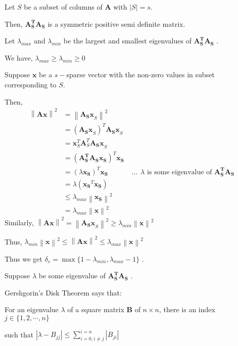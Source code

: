 \documentclass[fleqn, 11pt]{article}
\newcommand{\bs}[1]{\boldsymbol{#1}}
\newcommand\norm[1]{\left\lVert#1\right\rVert}
\begin{document}
Let $S$ be a subset of columns of $\bs{A}$ with $|S|=s$. 

\medskip 

Then, $\bs{A_S^TA_S}$ is a symmetric positive semi definite matrix. 

\medskip 

Let $\lambda_{max}$ and $\lambda_{min}$ be the largest and smallest eigenvalues of $\bs{A_S^TA_S}$ . 

We have, $\lambda_{max} \geq   \lambda_{min} \geq 0$


Suppose $\bs{x}$ be a $s-$sparse vector with the non-zero values in subset corresponding to $S$. 

Then,
\begin{align*}
    \norm{\bs{Ax}}^2 &= \norm{\bs{A_Sx}_S}^2  \\
&= (\bs{A_Sx}_S)^T \bs{A_Sx}_S \\
&= \bs{x}_S^T  \bs{A}_S^T \bs{A_Sx}_S     \\
&= (\bs{A_S^TA_Sx_S})^T \bs{x_S} \\
&=  (\lambda \bs{x_S})^T \bs{x_S}  \hspace{40pt} 
 \ldots \hspace{5pt} \lambda \text{ is some eigenvalue of } \bs{A_S^TA_S}  \\
&= \lambda (\bs{x_S}^T \bs{x_S}) \\
&\leq \lambda_{max} \bs{\norm{x_S}}^2\\
&= \lambda_{max} \bs{\norm{x}}^2
\end{align*}
Similarly,
$\norm{\bs{Ax}} ^2 = \norm{\bs{A_Sx}_S}  ^2 \geq \lambda_{min} \bs{\norm{x}}^2 $

\medskip

Thus, $\lambda_{min} \bs{\norm{x}}^2 \leq \bs{\norm{Ax}}^2 \leq \lambda_{max} \bs{\norm{x}}^2$

\medskip 
Thus we get $\delta_s = \max \{ 1 - \lambda_{min} , \lambda_{max} -1 \}$ . 

\medskip 


\medskip 
Suppose $ \lambda  $ be some eigenvalue of $\bs{A_S^TA_S}$ . 

\medskip 

Gershgorin’s Disk Theorem says that: 

For an eigenvalue $\lambda$ of a square matrix $\bs{B}$ of $n \times n$, there is an index $j \in \{ 1,2,\cdots,n \}$

such that $| \lambda - B_{jj} | \leq \displaystyle \sum_{i=0, i \neq j}^{i=n} |B_{ji} |$

\medskip 
\end{document}
